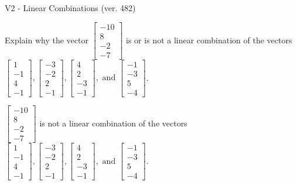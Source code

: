 \begin{exercise}
  \begin{exerciseTitle}V2 - Linear Combinations (ver. 482)\end{exerciseTitle}
  \begin{exerciseStatement}
    Explain why the vector \(\left[\begin{array}{c}
-10 \\
8 \\
-2 \\
-7
\end{array}\right]\)  is or is not a linear 
	combination of the vectors \(\left[\begin{array}{c}
1 \\
-1 \\
4 \\
-1
\end{array}\right] , \left[\begin{array}{c}
-3 \\
-2 \\
2 \\
-1
\end{array}\right] , \left[\begin{array}{c}
4 \\
2 \\
-3 \\
-1
\end{array}\right] , \text{ and } \left[\begin{array}{c}
-1 \\
-3 \\
5 \\
-4
\end{array}\right]\).
	


  \end{exerciseStatement}
  \begin{exerciseAnswer}
   \(\left[\begin{array}{c}
-10 \\
8 \\
-2 \\
-7
\end{array}\right]\) 
  	 is not  
	a linear combination of the vectors \(\left[\begin{array}{c}
1 \\
-1 \\
4 \\
-1
\end{array}\right] , \left[\begin{array}{c}
-3 \\
-2 \\
2 \\
-1
\end{array}\right] , \left[\begin{array}{c}
4 \\
2 \\
-3 \\
-1
\end{array}\right] , \text{ and } \left[\begin{array}{c}
-1 \\
-3 \\
5 \\
-4
\end{array}\right]\).


\end{exerciseAnswer}
\end{exercise}
